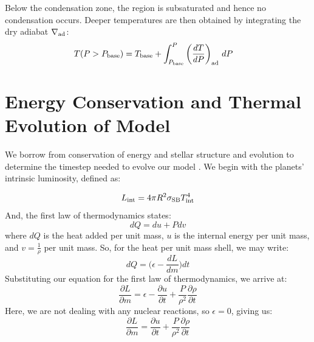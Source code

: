 \documentclass[11pt]{ucscthesisbs}
\begin{document}
Below the condensation zone, the region is subsaturated and hence no condensation occurs. Deeper temperatures are then obtained by integrating the dry adiabat $\nabla_{\rm ad}$:
\begin{align}
T(P>P_{\rm base}) &= T_{\rm base} + \int_{P_{\rm base}}^P\left(\frac{dT}{dP}\right)_{\rm ad}\,d P
\end{align}



\section{Energy Conservation and Thermal Evolution of Model}
We borrow from conservation of energy and stellar structure and evolution to determine the timestep needed to evolve our model \citep{kippenhahn_2012}. We begin with the planets' intrinsic luminosity, defined as:

\begin{equation}
L_{\rm int} = 4\pi R^2\sigma_{\rm SB}T_{\rm int}^4
\end{equation}
And, the first law of thermodynamics states:
\begin{equation}
dQ = du + Pdv
\end{equation}
where $dQ$ is the heat added per unit mass, $u$ is the internal energy per unit mass, and $v = \frac{1}{\rho}$ per unit mass.
So, for the heat per unit mass shell, we may write:
\begin{equation}
dQ = \big(\epsilon - \frac{dL}{dm})dt
\end{equation}
Substituting our equation for the first law of thermodynamics, we arrive at:
\begin{equation}
\frac{\partial L}{\partial m} = \epsilon - \frac{\partial u}{\partial t} + \frac{P}{\rho^2}\frac{\partial \rho}{\partial t}
\end{equation}
Here, we are not dealing with any nuclear reactions, so $\epsilon = 0$, giving us:
\begin{equation}
\frac{\partial L}{\partial m} = \frac{\partial u}{\partial t} + \frac{P}{\rho^2}\frac{\partial \rho}{\partial t}
\end{equation}
\end{document}

